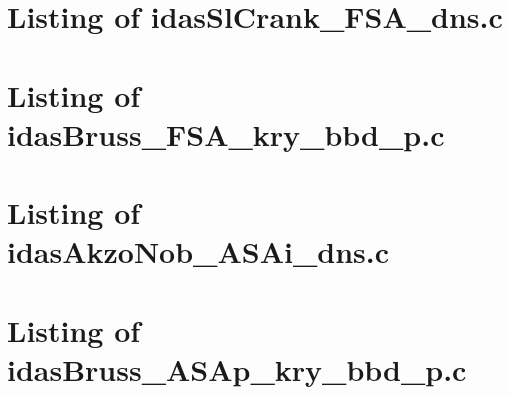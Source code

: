 
\lstset{language=C}

\newpage
\section{Listing of idasSlCrank\_FSA\_dns.c}\label{s:idasSlCrank_FSA_dns_c}

\newpage
\section{Listing of idasBruss\_FSA\_kry\_bbd\_p.c}\label{s:idasBruss_FSA_kry_bbd_p_c}


\newpage
\section{Listing of idasAkzoNob\_ASAi\_dns.c}\label{s:idasAkzoNob_ASAi_dns_c}

\newpage
\section{Listing of idasBruss\_ASAp\_kry\_bbd\_p.c}\label{s:idasBruss_ASAp_kry_bbd_p_c}
